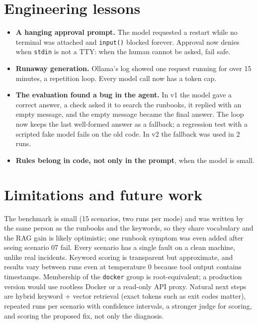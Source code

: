 \documentclass[10pt,a4paper]{article}
\newcommand{\code}[1]{\texttt{#1}}
\begin{document}
\section{Engineering lessons}\label{sec:lessons}
\begin{itemize}
\item \textbf{A hanging approval prompt.} The model requested a restart while no terminal was attached
  and \code{input()} blocked forever. Approval now denies when \code{stdin} is not a TTY: when the
  human cannot be asked, fail safe.
\item \textbf{Runaway generation.} Ollama's log showed one request running for over 15 minutes, a
  repetition loop. Every model call now has a token cap.
\item \textbf{The evaluation found a bug in the agent.} In v1 the model gave a correct answer, a check
  asked it to search the runbooks, it replied with an empty message, and the empty message became the
  final answer. The loop now keeps the last well-formed answer as a fallback; a regression test with a
  scripted fake model fails on the old code. In v2 the fallback was used in 2 runs.
\item \textbf{Rules belong in code, not only in the prompt}, when the model is small.
\end{itemize}

\section{Limitations and future work}
The benchmark is small (15 scenarios, two runs per mode) and was written by the same person as the
runbooks and the keywords, so they share vocabulary and the RAG gain is likely optimistic; one
runbook symptom was even added after seeing scenario 07 fail. Every scenario has a single fault on a
clean machine, unlike real incidents. Keyword scoring is transparent but approximate, and results vary
between runs even at temperature 0 because tool output contains timestamps. Membership of the
\code{docker} group is root-equivalent; a production version would use rootless Docker or a
read-only API proxy. Natural next steps are hybrid keyword + vector retrieval (exact tokens such as
exit codes matter), repeated runs per scenario with confidence intervals, a stronger judge for
scoring, and scoring the proposed fix, not only the diagnosis.

\vspace{4pt}
\end{document}
